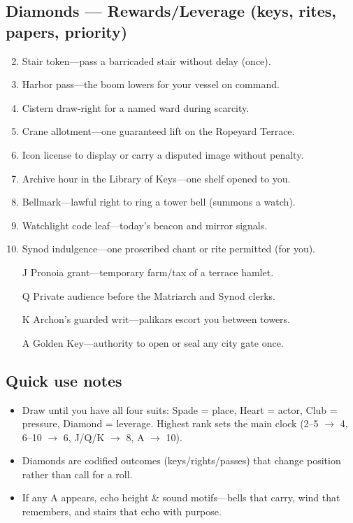 \subsection*{Diamonds --- Rewards/Leverage (keys, rites, papers, priority)}
\label{sec:thepyrgos-rewards}
\begin{enumerate}
\setcounter{enumi}{1}
\item Stair token---pass a barricaded stair without delay (once).
\item Harbor pass---the boom lowers for your vessel on command.
\item Cistern draw-right for a named ward during scarcity.
\item Crane allotment---one guaranteed lift on the Ropeyard Terrace.
\item Icon license to display or carry a disputed image without penalty.
\item Archive hour in the Library of Keys---one shelf opened to you.
\item Bellmark---lawful right to ring a tower bell (summons a watch).
\item Watchlight code leaf---today's beacon and mirror signals.
\item Synod indulgence---one proscribed chant or rite permitted (for you).
\item[J] Pronoia grant---temporary farm/tax of a terrace hamlet.
\item[Q] Private audience before the Matriarch and Synod clerks.
\item[K] Archon's guarded writ---palikars escort you between towers.
\item[A] Golden Key---authority to open or seal any city gate once.
\end{enumerate}

\subsection*{Quick use notes}
\label{sec:thepyrgos-quick-use}
\begin{itemize}
\item Draw until you have all four suits: Spade = place, Heart = actor, Club = pressure, Diamond = leverage. Highest rank sets the main clock (2--5 $\rightarrow$ 4, 6--10 $\rightarrow$ 6, J/Q/K $\rightarrow$ 8, A $\rightarrow$ 10).
\item Diamonds are codified outcomes (keys/rights/passes) that change position rather than call for a roll.
\item If any A appears, echo height \& sound motifs---bells that carry, wind that remembers, and stairs that echo with purpose.
\end{itemize}

